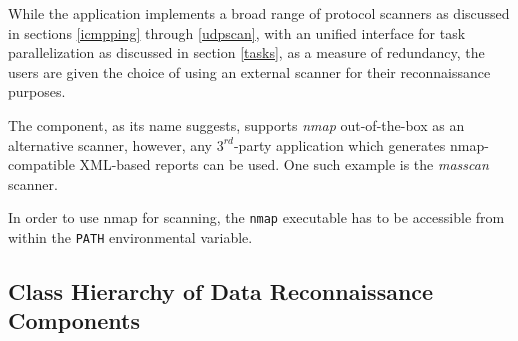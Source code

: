 \documentclass[a4paper,12pt]{article}
\begin{document}
	While the application implements a broad range of protocol scanners as discussed in sections \ref{icmpping} through \ref{udpscan}, with an unified interface for task parallelization as discussed in section \ref{tasks}, as a measure of redundancy, the users are given the choice of using an external scanner for their reconnaissance purposes.
	
	The component, as its name suggests, supports \textit{nmap} out-of-the-box as an alternative scanner, however, any $3^{rd}$-party application which generates nmap-compatible XML-based reports can be used. One such example is the \textit{masscan} scanner.
	
	In order to use nmap for scanning, the \texttt{nmap} executable has to be accessible from within the \texttt{PATH} environmental variable.

\newpage
\subsection{Class Hierarchy of Data Reconnaissance Components}
 
\end{document}
